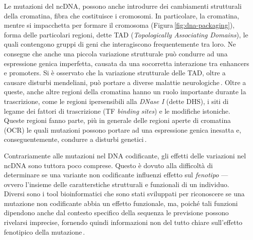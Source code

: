 Le mutazioni del \acs{ncDNA}, possono anche introdurre dei cambiamenti strutturali della cromatina, fibra che costituisce i cromosomi. In particolare, la cromatina, mentre si impacchetta per formare il cromosoma (Figura\,\ref{fig:dna-packaging}), forma delle particolari regioni, dette \acs{TAD} (\textit{Topologically Associating Domains}), le quali contengono gruppi di geni che interagiscono frequentemente tra loro. Ne consegue che anche una piccola variazione strutturale può condurre ad una espressione genica imperfetta, causata da una socorretta interazione tra enhancers e promoters. Si è osservato che la variazione strutturale delle \acs{TAD}, oltre a causare disturbi mendeliani, può portare a diverse malattie neurologiche\,\cite{french2020role, kaiser2017tads}. Oltre a queste, anche altre regioni della cromatina hanno un ruolo importante durante la trascrizione, come le regioni ipersensibili alla \textsl{DNase I} (dette \acs{DHS}), i siti di legame dei fattori di trascrizione (\acs{TF} \textit{binding sites}) e le modifiche istoniche. Queste regioni fanno parte, più in generale delle regioni aperte di cromatina (\acs{OCR}) le quali mutazioni possono portare ad una espressione genica inesatta e, conseguentemente, condurre a disturbi genetici\,\cite{zhou2015predicting, ma2023deepsata}.

Contrariamente alle mutazioni nel \acs{DNA} codificante, gli effetti delle variazioni nel \acs{ncDNA} sono tuttora poco comprese. Questo è dovuto alla difficoltà di determinare se una variante non codificante influenzi effetto sul \textsl{fenotipo} — ovvero l'insieme delle caratterstiche strutturali e funzionali di un individuo. Diversi sono i tool bioinformatici che sono stati sviluppati per riconoscere se una mutazione non codificante abbia un effetto funzionale, ma, poiché tali funzioni dipendono anche dal contesto specifico della sequenza le previsione possono rivelarsi imprecise, fornendo quindi informazioni non del tutto chiare sull'effetto fenotipico della mutazione\,\cite{schipper2022demystifying, pena2024decoding}. 

